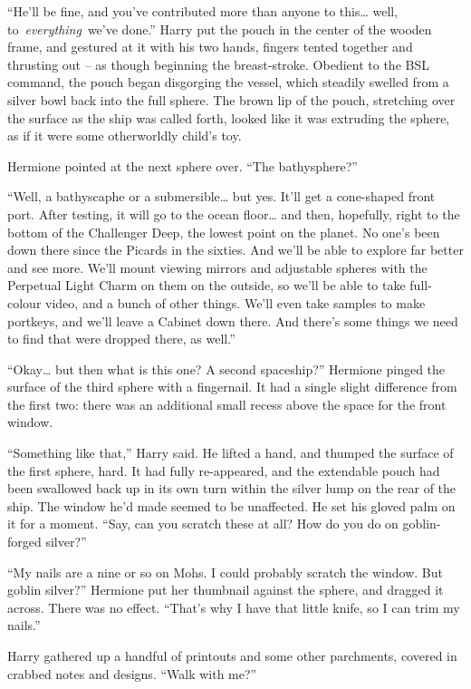 ``He'll be fine, and you've contributed more than anyone to this\ldots{}
well, to~\emph{everything}~we've done.'' Harry put the pouch in the
center of the wooden frame, and gestured at it with his two hands,
fingers tented together and thrusting out -- as though beginning the
breast-stroke. Obedient to the BSL command, the pouch began disgorging
the vessel, which steadily swelled from a silver bowl back into the full
sphere. The brown lip of the pouch, stretching over the surface as the
ship was called forth, looked like it was extruding the sphere, as if it
were some otherworldly child's toy.

Hermione pointed at the next sphere over. ``The bathysphere?''

``Well, a bathyscaphe or a submersible\ldots{} but yes. It'll get a
cone-shaped front port. After testing, it will go to the ocean
floor\ldots{} and then, hopefully, right to the bottom of the Challenger
Deep, the lowest point on the planet. No one's been down there since the
Picards in the sixties. And we'll be able to explore far better and see
more. We'll mount viewing mirrors and adjustable spheres with the
Perpetual Light Charm on them on the outside, so we'll be able to take
full-colour video, and a bunch of other things. We'll even take samples
to make portkeys, and we'll leave a Cabinet down there. And there's some
things we need to find that were dropped there, as well.''

``Okay\ldots{} but then what is this one? A second spaceship?'' Hermione
pinged the surface of the third sphere with a fingernail. It had a
single slight difference from the first two: there was an additional
small recess above the space for the front window.

``Something like that,'' Harry said. He lifted a hand, and thumped the
surface of the first sphere, hard. It had fully re-appeared, and the
extendable pouch had been swallowed back up in its own turn within the
silver lump on the rear of the ship. The window he'd made seemed to be
unaffected. He set his gloved palm on it for a moment. ``Say, can you
scratch these at all? How do you do on goblin-forged silver?''

``My nails are a nine or so on Mohs. I could probably scratch the
window. But goblin silver?'' Hermione put her thumbnail against the
sphere, and dragged it across. There was no effect. ``That's why I have
that little knife, so I can trim my nails.''

Harry gathered up a handful of printouts and some other parchments,
covered in crabbed notes and designs. ``Walk with me?''

